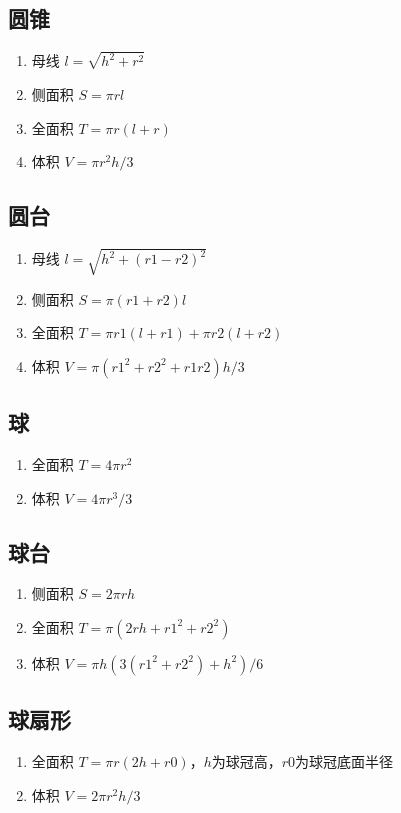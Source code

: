 \subsection*{圆锥}
	\begin{enumerate}
		\item 母线 $l=\sqrt{h^2+r^2}$
		\item 侧面积 $S=\pi rl$
		\item 全面积 $T=\pi r(l+r)$
		\item 体积 $V=\pi r^2h/3$
	\end{enumerate}

\subsection*{圆台}
	\begin{enumerate}
		\item 母线 $l=\sqrt{h^2+(r1-r2)^2}$
		\item 侧面积 $S=\pi(r1+r2)l$
		\item 全面积 $T=\pi r1(l+r1)+\pi r2(l+r2)$
		\item 体积 $V=\pi(r1^2+r2^2+r1r2)h/3$
	\end{enumerate}

\subsection*{球}
	\begin{enumerate}
		\item 全面积 $T=4\pi r^2$
		\item 体积 $V=4\pi r^3/3$
	\end{enumerate}

\subsection*{球台}
	\begin{enumerate}
		\item 侧面积 $S=2\pi rh$
		\item 全面积 $T=\pi(2rh+r1^2+r2^2)$
		\item 体积 $V=\pi h(3(r1^2+r2^2)+h^2)/6$
	\end{enumerate}

\subsection*{球扇形}
	\begin{enumerate}
		\item 全面积 $T=\pi r(2h+r0)$，$h$为球冠高，$r0$为球冠底面半径
		\item 体积 $V=2\pi r^2h/3$
	\end{enumerate}

